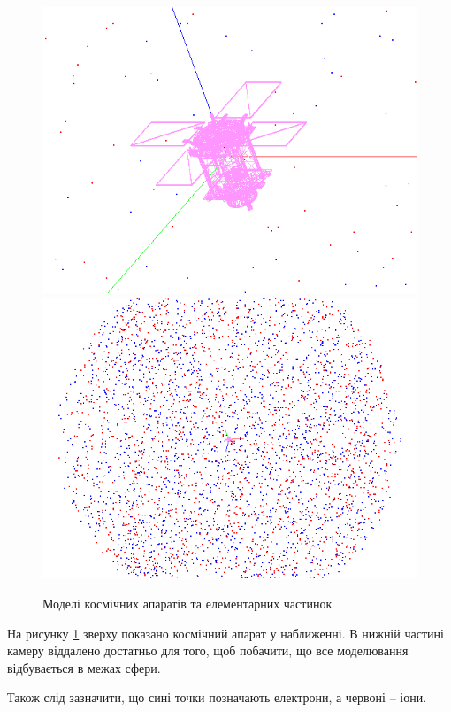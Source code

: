 \documentclass[a4paper,12pt]{article}
\begin{document}
\begin{figure}[!htp]
\centering
\includegraphics[scale=0.7]{screens/screenshot3.png}
\includegraphics[scale=0.7]{screens/screenshot4.png}
\caption{Моделі космічних апаратів та елементарних частинок}
\label{fig:f2}
\end{figure}
\newpage

На рисунку \ref{fig:f2} зверху показано космічний апарат у наближенні. В нижній частині камеру віддалено достатньо для того, щоб побачити, що все моделювання відбувається в межах сфери.

Також слід зазначити, що сині точки позначають електрони, а червоні -- іони.
\end{document}
